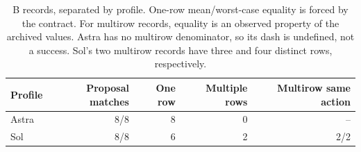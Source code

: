 \begin{table}[htbp]
\centering\small
\begin{tabular}{lrrrr}\toprule
Profile & Proposal matches & One row & Multiple rows & Multirow same action\\\midrule
Astra & 8/8 & 8 & 0 & --\\
Sol & 8/8 & 6 & 2 & 2/2\\
\bottomrule\end{tabular}
\caption{B records, separated by profile. One-row mean/worst-case equality is
forced by the contract. For multirow records, equality is an observed property
of the archived values. Astra has no multirow denominator, so its dash is
undefined, not a success. Sol's two multirow records have three and four
distinct rows, respectively.}
\label{tab:B-structure}
\end{table}
